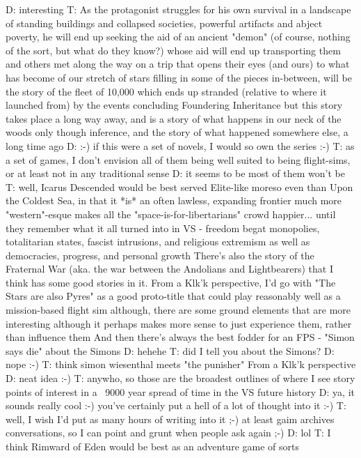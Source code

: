 D: interesting
T: As the protagonist struggles for his own survival in a landscape of standing buildings and collapsed societies, powerful artifacts and abject poverty, he will end up seeking the aid of an ancient "demon"
(of course, nothing of the sort, but what do they know?)
whose aid will end up transporting them and others met along the way on a trip that opens their eyes (and ours) to what has become of our stretch of stars
filling in some of the pieces in-between, will be the story of the fleet of 10,000 which ends up stranded (relative to where it launched from) by the events concluding Foundering Inheritance
but this story takes place a long way away, and is a story of what happens in our neck of the woods only though inference, and the story of what happened somewhere else, a long time ago
D: :-)
if this were a set of novels, I would so own the series :-)
T: as a set of games, I don't envision all of them being well suited to being flight-sims, or at least not in any traditional sense
D: it seems to be most of them won't be
T: well, Icarus Descended would be best served Elite-like
moreso even than Upon the Coldest Sea, in that it *is* an often lawless, expanding frontier
much more "western"-esque
makes all the "space-is-for-libertarians" crowd happier... until they remember what it all turned into in VS - freedom begat monopolies, totalitarian states, fascist intrusions, and religious extremism as well as democracies, progress, and personal growth
There's also the story of the Fraternal War (aka. the war between the Andolians and Lightbearers) that I think has some good stories in it. From a Klk'k perspective, I'd go with "The Stars are also Pyres" as a good proto-title
that could play reasonably well as a mission-based flight sim
although, there are some ground elements that are more interesting
although it perhaps makes more sense to just experience them, rather than influence them
And then there's always the best fodder for an FPS - "Simon says die"
about the Simons
D: hehehe
T: did I tell you about the Simons?
D: nope :-)
T: think simon wiesenthal meets "the punisher"
From a Klk'k perspective
D: neat idea :-)
T: anywho, so those are the broadest outlines of where I see story points of interest in a ~9000 year spread of time in the VS future history
D: ya, it sounds really cool :-) you've certainly put a hell of a lot of thought into it :-)
T: well, I wish I'd put as many hours of writing into it ;-)
at least gaim archives conversations, so I can point and grunt when people ask again ;-)
D: lol
T: I think Rimward of Eden would be best as an adventure game of sorts
